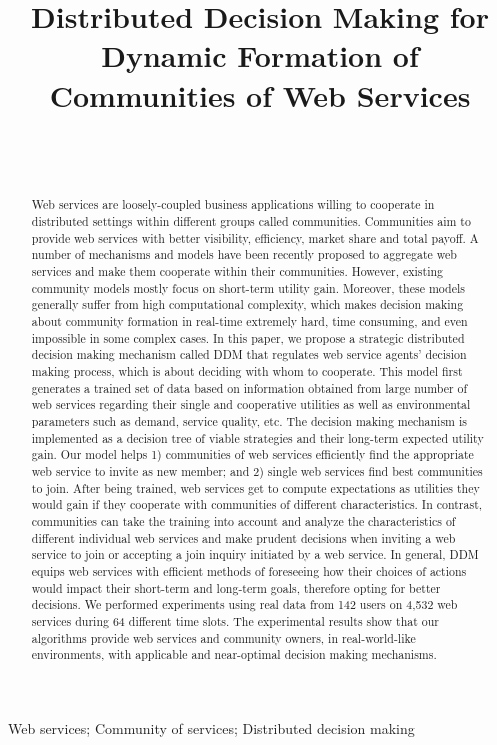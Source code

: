 \documentclass[11pt,onecolumn]{IEEEtran}
\author{
    \IEEEauthorblockN{\normalsize Ehsan Khosrowshahi Asl\IEEEauthorrefmark{1}, Jamal Bentahar\IEEEauthorrefmark{1}, Hadi Otrok\IEEEauthorrefmark{2}, Babak Khosravifar\IEEEauthorrefmark{1}, Rabeb Mizouni\IEEEauthorrefmark{2}}\\
    \IEEEauthorblockA{\IEEEauthorrefmark{1}Concordia Institute for Information Systems Engineering, Concordia University, Montreal, Canada}
    \\
    \IEEEauthorblockA{\IEEEauthorrefmark{2}Department of Electrical and Computer Engineering, KUSTAR, Abu Dhabi, UAE}
}
\title{Distributed Decision Making for Dynamic Formation of Communities of Web Services}
\begin{document}
\maketitle

\begin{abstract}
Web services are loosely-coupled business applications willing to cooperate in distributed settings within different groups called communities. Communities aim to provide web services with better visibility, efficiency, market share and total payoff. A number of mechanisms and models have been recently proposed to aggregate web
services and make them cooperate within their communities. However, existing community models mostly focus on short-term utility gain. Moreover, these models generally suffer from high computational complexity, which makes decision making about community formation in real-time extremely hard, time consuming, and even impossible in some complex cases. In this paper, we propose a strategic distributed decision making mechanism called DDM that regulates web service agents' decision making process, which is about deciding with whom to cooperate. This model first generates a trained set of data based on information obtained from large number of web services regarding their single and cooperative utilities as well as environmental parameters such as demand, service quality, etc. The decision making mechanism is implemented as a decision tree of viable strategies and their long-term expected utility gain.
Our model helps 1) communities of web services efficiently find the appropriate web service to invite as new member; and 2) single web services find best communities to join. After being trained, web services get to compute expectations as utilities they would gain if they cooperate with communities of different characteristics. In contrast, communities can take the training into account and analyze the characteristics of different individual web services and make prudent decisions when inviting a web service to join or accepting a join inquiry initiated by a web service. In general, DDM equips web services with efficient methods of foreseeing how their choices of actions would impact their short-term and long-term goals, therefore opting for better decisions. We performed experiments using real data from 142 users on 4,532 web services during 64 different time slots. The experimental results show that our algorithms provide web services and community owners, in real-world-like environments, with applicable and near-optimal decision making mechanisms.
\end{abstract}
\begin{IEEEkeywords}
Web services; Community of services; Distributed decision making
\end{IEEEkeywords}
\end{document}
